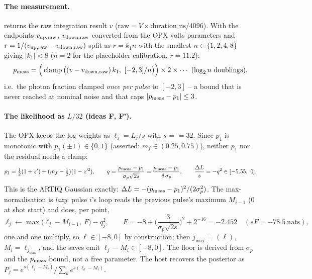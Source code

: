 \paragraph{The measurement.}  returns the raw integration
result $v$ ($\mathrm{raw} = V \times \mathrm{duration\_ns}/4096$). With the
endpoints $v_{\rm up,raw}$, $v_{\rm down,raw}$ converted from the OPX volts
parameters and $r = 1/(v_{\rm up,raw} - v_{\rm down,raw})$ split as $r = k_1 n$
with the smallest $n \in \{1, 2, 4, 8\}$ giving $|k_1| < 8$ ($n = 2$ for the
placeholder calibration, $r = 11.2$):
\[
  p_{\rm meas} = \Big(\operatorname{clamp}\big((v - v_{\rm down,raw})\,k_1,\ [-2, 3]/n\big)\Big) \times 2 \times \cdots\ (\log_2 n\ \text{doublings}),
\]
i.e.\ the photon fraction clamped \emph{once per pulse} to $[-2, 3]$ -- a bound
that is never reached at nominal noise and that caps $|p_{\rm meas} - p_1| \le 3$.

\paragraph{The likelihood as $L/32$ (ideas F, F').} The OPX keeps the log
weights as $\ell_j = L_j/s$ with $s$ =  $= 32$.
Since $p_1$ is monotonic with $p_1(\pm 1) \in \{0, 1\}$ (asserted:
$m_f \in (0.25, 0.75)$), neither $p_1$ nor the residual needs a clamp:
\[
  p_1 = \tfrac12(1 + z') + (m_f - \tfrac12)(1 - z'^2),\qquad
  q = \frac{p_{\rm meas} - p_1}{\sigma_p\sqrt{2s}} = \frac{p_{\rm meas} - p_1}{8\,\sigma_p},\qquad
  \frac{\Delta L}{s} = -q^2 \in [-5.55,\ 0].
\]
This is the ARTIQ Gaussian exactly: $\Delta L = -(p_{\rm meas} - p_1)^2/(2\sigma_p^2)$.
The max-normalisation is \emph{lazy}: pulse $i$'s loop reads the previous
pulse's maximum $M_{i-1}$ (0 at shot start) and does, per point,
\[
  \ell_j \leftarrow \max\big(\ell_j - M_{i-1},\ F\big) - q_j^2,\qquad
  F = -8 + \Big(\frac{3}{\sigma_p\sqrt{2s}}\Big)^2 + 2^{-16} = -2.452\quad (sF = -78.5\ \text{nats}),
\]
one  and one multiply, so $\ell \in [-8, 0]$ by construction;
then $j_{\max}$ = $(\ell)$, $M_i = \ell_{j_{\max}}$, and the saves
emit $\ell_j - M_i \in [-8, 0]$. The floor is derived from $\sigma_p$ and the
$p_{\rm meas}$ bound, not a free parameter. The host recovers the posterior as
$P_j = e^{s(\ell_j - M_i)}/\sum_k e^{s(\ell_k - M_i)}$.

